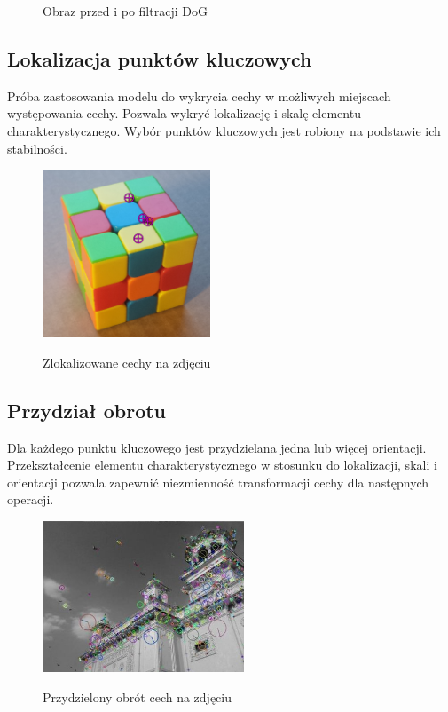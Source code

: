    \begin{figure}[h]
      \centering
      \smallskip{ }
      \smallskip{ }
   \caption{Obraz przed i po filtracji DoG}
   \label {fig:DoG}
   \end{figure}



\subsection{Lokalizacja punktów kluczowych}
      Próba zastosowania modelu do wykrycia cechy w możliwych miejscach występowania cechy. Pozwala wykryć lokalizację i skalę elementu charakterystycznego. Wybór punktów kluczowych jest robiony na podstawie ich stabilności.

      \begin{figure}[h]
         \centering
         \includegraphics[width=5cm]{SIFT_cube_points.png}
         \label {fig:SIFT_points}
         \caption{Zlokalizowane cechy na zdjęciu}
      \end{figure}

\subsection{Przydział obrotu}
      Dla każdego punktu kluczowego jest przydzielana jedna lub więcej orientacji.
      Przekształcenie elementu charakterystycznego w stosunku do lokalizacji, skali i orientacji pozwala zapewnić niezmienność transformacji cechy dla następnych operacji.
      \begin{figure}[h]
         \centering
         \includegraphics[width=6cm]{SIFT_opencv.jpg}
         \label {fig:SIFT_rot}
         \caption{Przydzielony obrót cech na zdjęciu}
      \end{figure}
